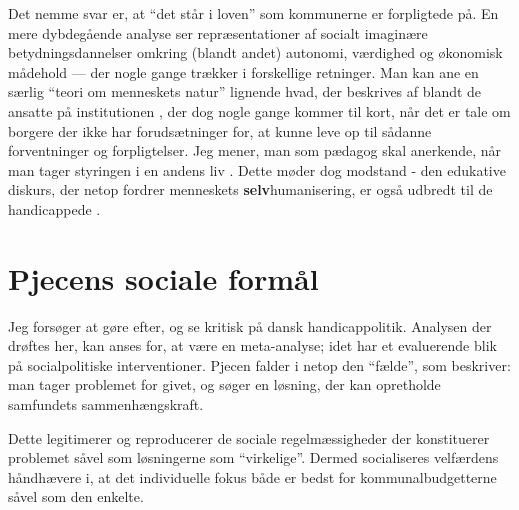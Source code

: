 Det nemme svar er, at “det står i loven” som kommunerne er forpligtede på.
En mere dybdegående analyse ser repræsentationer af socialt imaginære betydningsdannelser  \autocite[s. 91]{moutsiosSocialeInstitutionerOg2016} omkring (blandt andet) autonomi, værdighed og økonomisk mådehold --- der nogle gange trækker i forskellige retninger.
Man kan ane en særlig “teori om menneskets natur” lignende hvad, der beskrives af \citeauthor{goffmanAsylumsEssaysSocial1991} blandt de ansatte på institutionen \autocite[ss. 84-85]{goffmanAsylumsEssaysSocial1991}, der dog nogle gange kommer til kort, når det er tale om borgere der ikke har forudsætninger for, at kunne leve op til sådanne forventninger og forpligtelser.
Jeg mener, man som pædagog skal anerkende, når man tager styringen i en andens liv \autocite{andersenSocialWorkPower2018}.
Dette møder dog modstand - den edukative diskurs, der netop fordrer menneskets \textbf{selv}humanisering, er også udbredt til de handicappede \autocite[s. 77]{lieberkindUddannelsessamfundetOgEdukative2016}.

\section{Pjecens sociale formål}
Jeg forsøger at gøre \citeauthor{scheurichPolicyArchaeologyNew1994} efter, og se kritisk på dansk handicappolitik.
Analysen der drøftes her, kan anses for, at være en meta-analyse; idet  har et evaluerende blik på socialpolitiske interventioner.
Pjecen falder i netop den “fælde”, som \citeauthor{scheurichPolicyArchaeologyNew1994} beskriver: man tager problemet for givet, og søger en løsning, der kan opretholde samfundets sammenhængskraft.

Dette legitimerer og reproducerer de sociale regelmæssigheder der konstituerer problemet såvel som løsningerne som “virkelige”. Dermed socialiseres velfærdens håndhævere i, at det individuelle fokus både er bedst for kommunalbudgetterne såvel som den enkelte.
